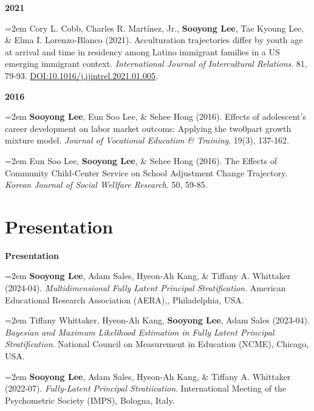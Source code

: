 \documentclass[11pt,letterpaper,]{awesome-me}
\begin{document}
\setlength{\leftskip}{0cm}

\textbf{2021}

\setlength{\leftskip}{0.5cm}

\hangindent=2em  Cory L. Cobb, Charles R. Martínez, Jr.,
\textbf{Sooyong Lee}, Tae Kyoung Lee, \& Elma I. Lorenzo-Blanco (2021).
Acculturation trajectories differ by youth age at arrival and time in
residency among Latino immigrant families in a US emerging immigrant
context. \emph{International Journal of Intercultural Relations}. 81,
79-93. \url{DOI:10.1016/j.ijintrel.2021.01.005}.

\setlength{\leftskip}{0cm}

\textbf{2016}

\setlength{\leftskip}{0.5cm}

\hangindent=2em  \textbf{Sooyong Lee}, Eun Soo Lee, \& Sehee
Hong (2016). Effects of adolescent's career development on labor market
outcoms: Applying the two0part growth mixture model. \emph{Journal of
Vocational Education \& Training}. 19(3), 137-162.

\hangindent=2em  Eun Soo Lee, \textbf{Sooyong Lee}, \& Sehee
Hong (2016). The Effects of Community Child-Center Service on School
Adjustment Change Trajectory. \emph{Korean Journal of Social Wellfare
Research}. 50, 59-85.

\setlength{\leftskip}{0cm}

\hypertarget{presentation}{%
\section{Presentation}\label{presentation}}

\setlength{\leftskip}{0cm}

\textbf{Presentation}

\setlength{\leftskip}{0.5cm}

\hangindent=2em  \textbf{Sooyong Lee}, Adam Sales, Hyeon-Ah
Kang, \& Tiffany A. Whittaker (2024-04). \emph{Multidimensional Fully
Latent Principal Stratification}. American Educational Research
Association (AERA),, Philadelphia, USA.

\hangindent=2em  Tiffany Whittaker, Hyeon-Ah Kang,
\textbf{Sooyong Lee}, Adam Sales (2023-04). \emph{Bayesian and Maximum
Likelihood Estimation in Fully Latent Principal Stratification}.
National Council on Measurement in Education (NCME), Chicago, USA.

\hangindent=2em  \textbf{Sooyong Lee}, Adam Sales, Hyeon-Ah
Kang, \& Tiffany A. Whittaker (2022-07). \emph{Fully-Latent Principal
Stratiication}. International Meeting of the Psychometric Society
(IMPS), Bologna, Italy.
\end{document}
